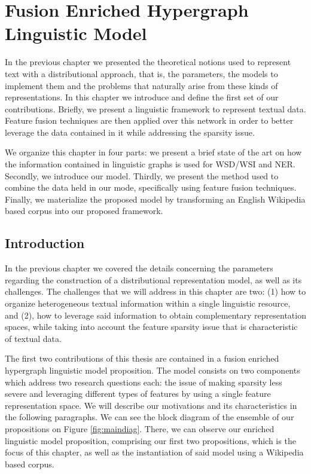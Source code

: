 \chapter{Fusion Enriched Hypergraph Linguistic Model}
\label{chap:ling_net}
\begin{abstractchap}
In the previous chapter we presented the theoretical notions used to represent text with a distributional approach, that is, the parameters, the models to implement them  and the problems that naturally arise from these kinds of representations. In this chapter we introduce and define the first set of our contributions. Briefly, we present a linguistic framework to represent textual data. Feature fusion techniques are then applied over this network in order to better leverage the data contained in it while addressing the sparsity issue.

We organize this  chapter  in four parts: we present a brief state of the art on how the information contained in linguistic graphs is used for WSD/WSI and NER. Secondly, we introduce our model. Thirdly, we present  the method used to combine the data held in our mode, specifically using feature fusion techniques. Finally, we materialize the proposed model by transforming an English Wikipedia based corpus into our proposed framework.
\end{abstractchap}
\minitoc

\section{Introduction}

In the previous chapter we covered the details concerning the parameters regarding the construction of a distributional representation model, as well as its challenges.
The challenges that we will address in this chapter are two: (1) how to organize heterogeneous textual information within a single linguistic resource, and (2), how to leverage said information to obtain complementary representation spaces, while taking into account the feature sparsity issue that is characteristic of textual data.


The first two contributions of this thesis are contained in a fusion enriched hypergraph linguistic model proposition. The model consists on two components which address two research questions each: the issue of making sparsity less severe and leveraging different types of features  by using a single feature representation space. We will describe our motivations and its characteristics in the following paragraphs. We can see the block diagram of the ensemble of our propositions  on Figure \ref{fig:maindiag}. There, we can observe our enriched linguistic model proposition, comprising our first two propositions, which is the focus of this chapter, as well as the instantiation of said model using a Wikipedia based corpus. %

